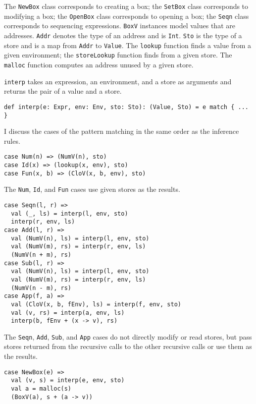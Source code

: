 The \verb!NewBox! class corresponds to creating a box; the \verb!SetBox! class
corresponds to modifying a box; the \verb!OpenBox! class corresponds to opening a
box; the \verb!Seqn! class corresponds to sequencing expressions. \verb!BoxV!
instances model values that are addresses. \verb!Addr! denotes the type of an
address and is \verb!Int!. \verb!Sto! is the type of a store and is a map from
\verb!Addr! to \verb!Value!. The \verb!lookup! function finds a value from a
given environment; the \verb!storeLookup! function finds from a given store. The
\verb!malloc! function computes an address unused by a given store.

\verb!interp! takes an expression, an environment, and a store as arguments and
returns the pair of a value and a store.

\begin{verbatim}
def interp(e: Expr, env: Env, sto: Sto): (Value, Sto) = e match { ... }
\end{verbatim}

I discuss the cases of the pattern matching in the same order as the inference
rules.

\begin{verbatim}
case Num(n) => (NumV(n), sto)
case Id(x) => (lookup(x, env), sto)
case Fun(x, b) => (CloV(x, b, env), sto)
\end{verbatim}

The \verb!Num!, \verb!Id!, and \verb!Fun! cases use given stores as the results.

\begin{verbatim}
case Seqn(l, r) =>
  val (_, ls) = interp(l, env, sto)
  interp(r, env, ls)
case Add(l, r) =>
  val (NumV(n), ls) = interp(l, env, sto)
  val (NumV(m), rs) = interp(r, env, ls)
  (NumV(n + m), rs)
case Sub(l, r) =>
  val (NumV(n), ls) = interp(l, env, sto)
  val (NumV(m), rs) = interp(r, env, ls)
  (NumV(n - m), rs)
case App(f, a) =>
  val (CloV(x, b, fEnv), ls) = interp(f, env, sto)
  val (v, rs) = interp(a, env, ls)
  interp(b, fEnv + (x -> v), rs)
\end{verbatim}

The \verb!Seqn!, \verb!Add!, \verb!Sub!, and \verb!App! cases do not directly
modify or read stores, but pass stores returned from the recursive calls to the
other recursive calls or use them as the results.

\begin{verbatim}
case NewBox(e) =>
  val (v, s) = interp(e, env, sto)
  val a = malloc(s)
  (BoxV(a), s + (a -> v))
\end{verbatim}

